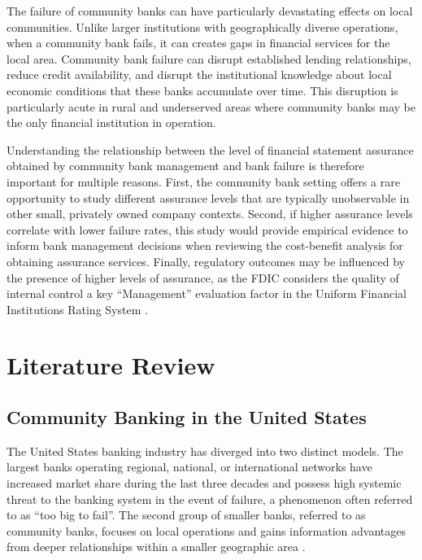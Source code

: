 \documentclass[12pt]{article}
\begin{document}
The failure of community banks can have particularly devastating effects on local communities. Unlike larger institutions with geographically diverse operations, when a community bank fails, it can creates gaps in financial services for the local area. Community bank failure can disrupt established lending relationships, reduce credit availability, and disrupt the institutional knowledge about local economic conditions that these banks accumulate over time. This disruption is particularly acute in rural and underserved areas where community banks may be the only financial institution in operation.

Understanding the relationship between the level of financial statement assurance obtained by community bank management and bank failure is therefore important for multiple reasons. First, the community bank setting offers a rare opportunity to study different assurance levels that are typically unobservable in other small, privately owned company contexts. Second, if higher assurance levels correlate with lower failure rates, this study would provide empirical evidence to inform bank management decisions when reviewing the cost-benefit analysis for obtaining assurance services. Finally, regulatory outcomes may be influenced by the presence of higher levels of assurance, as the FDIC considers the quality of internal control a key ``Management'' evaluation factor in the Uniform Financial Institutions Rating System \citep{FDIC2023}.

\section{Literature Review}

\subsection{Community Banking in the United States}

The United States banking industry has diverged into two distinct models. The largest banks operating regional, national, or international networks have increased market share during the last three decades and possess high systemic threat to the banking system in the event of failure, a phenomenon often referred to as ``too big to fail''. The second group of smaller banks, referred to as community banks, focuses on local operations and gains information advantages from deeper relationships within a smaller geographic area \citep{KandracMarsh2025}.
\end{document}
